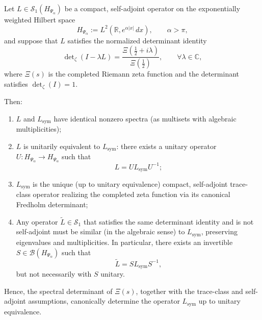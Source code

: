 \begin{lemma}
\label{lem:canonical-closure}
Let \( L \in \mathcal{S}_1(H_{\Psi_\alpha}) \) be a compact, self-adjoint operator on the exponentially weighted Hilbert space
\[
H_{\Psi_\alpha} := L^2(\mathbb{R}, e^{\alpha |x|} \, dx), \qquad \alpha > \pi,
\]
and suppose that \( L \) satisfies the normalized determinant identity
\[
\det\nolimits_\zeta(I - \lambda L) = \frac{\Xi\left(\tfrac{1}{2} + i\lambda\right)}{\Xi\left(\tfrac{1}{2}\right)}, \qquad \forall \lambda \in \mathbb{C},
\]
where \( \Xi(s) \) is the completed Riemann zeta function and the determinant satisfies \( \det_\zeta(I) = 1 \).

\medskip
\noindent
Then:
\begin{enumerate}
  \item \( L \) and \( L_{\mathrm{sym}} \) have identical nonzero spectra (as multisets with algebraic multiplicities);
  \item \( L \) is unitarily equivalent to \( L_{\mathrm{sym}} \): there exists a unitary operator \( U : H_{\Psi_\alpha} \to H_{\Psi_\alpha} \) such that
  \[
  L = U L_{\mathrm{sym}} U^{-1};
  \]
  \item \( L_{\mathrm{sym}} \) is the unique (up to unitary equivalence) compact, self-adjoint trace-class operator realizing the completed zeta function via its canonical Fredholm determinant;
  \item Any operator \( \widetilde{L} \in \mathcal{S}_1 \) that satisfies the same determinant identity and is not self-adjoint must be similar (in the algebraic sense) to \( L_{\mathrm{sym}} \), preserving eigenvalues and multiplicities. In particular, there exists an invertible \( S \in \mathcal{B}(H_{\Psi_\alpha}) \) such that
  \[
  \widetilde{L} = S L_{\mathrm{sym}} S^{-1},
  \]
  but not necessarily with \( S \) unitary.
\end{enumerate}

\medskip
\noindent
Hence, the spectral determinant of \( \Xi(s) \), together with the trace-class and self-adjoint assumptions, canonically determine the operator \( L_{\mathrm{sym}} \) up to unitary equivalence.
\end{lemma}
